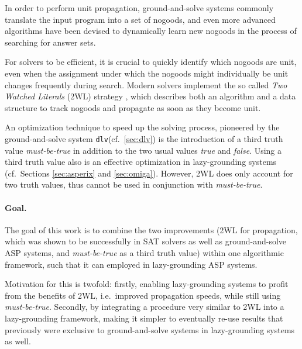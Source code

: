 \documentclass[final]{vutinfth} %
\newcommand{\mbt}{must-be-true\xspace}
\newcommand{\dlv}{\texttt{dlv}\xspace}
\begin{document}
In order to perform unit propagation, ground-and-solve systems commonly translate the input program into a set of nogoods, and even more advanced algorithms have been devised to dynamically learn new nogoods in the process of searching for answer sets. 

For solvers to be efficient, it is crucial to quickly identify which nogoods are unit, even when the assignment under which the nogoods might individually be unit changes frequently during search. Modern solvers implement the so called \emph{Two Watched Literals} (2WL) strategy \cite{effsat,questsat}, which describes both an algorithm and a data structure to track nogoods and propagate as soon as they become unit.

An optimization technique to speed up the solving process, pioneered by the ground-and-solve system \dlv (cf.~\ref{sec:dlv}) is the introduction of a third truth value \emph{\mbt} in addition to the two usual values \emph{true} and \emph{false}. Using a third truth value also is an effective optimization in lazy-grounding systems (cf.~Sections \ref{sec:asperix} and \ref{sec:omiga}). However, 2WL does only account for two truth values, thus cannot be used in conjunction with \emph{\mbt}.

\paragraph{Goal.} The goal of this work is to combine the two improvements (2WL for propagation, which was shown to be successfully in SAT solvers as well as ground-and-solve ASP systems, and \emph{\mbt} as a third truth value) within one algorithmic framework, such that it can employed in lazy-grounding ASP systems.

Motivation for this is twofold: firstly, enabling lazy-grounding systems to profit from the benefits of 2WL, i.e.~improved propagation speeds, while still using \emph{\mbt}. Secondly, by integrating a procedure very similar to 2WL into a lazy-grounding framework, making it simpler to eventually re-use results that previously were exclusive to ground-and-solve systems in lazy-grounding systems as well.


\end{document}
